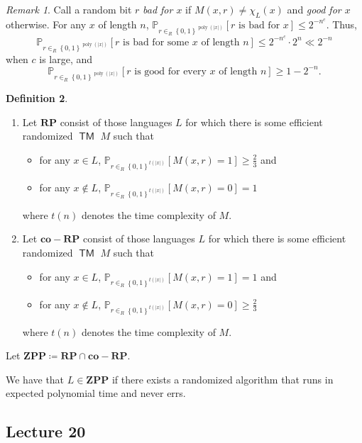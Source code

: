\documentclass[10pt,letterpaper,cm]{nupset}
\theoremstyle{definition}
\newtheorem{definition}{Definition}[subsection]
\theoremstyle{theorem}
\theoremstyle{remark}
\newtheorem{remark}[definition]{Remark}
\newcommand{\1}{\mathbf{1}}
\newcommand{\0}{\vec 0}
\DeclareMathOperator{\TM}{\mathsf{TM}}
\DeclareMathOperator{\poly}{poly}
\begin{document}
\begin{remark}\label{good}
Call a random bit $r$ \textit{bad for $x$} if $M(x, r) \ne \chi_L(x)$ and \textit{good for $x$} otherwise. For any $x$ of length $n$, $\mathbb{P}_{r\in_R \left\{0,1\right\}^{\poly(\lvert{x}\rvert)}}\left[r \text{ is bad for }x\right] \leq 2^{{-}n^c}$. Thus, $$\mathbb{P}_{r\in_R \left\{0,1\right\}^{\poly(\lvert{x}\rvert)}}\left[r \text{ is bad for some }x \text{ of length }n\right] \leq 2^{{-}n^c}\cdot 2^n \ll 2^{{-}n}$$ when $c$ is large, and $$\mathbb{P}_{r\in_R \left\{0,1\right\}^{\poly(\lvert{x}\rvert)}}\left[r \text{ is good for every }x \text{ of length }n\right] \geq 1 - 2^{{-}n}.$$
\end{remark}

\begin{definition} $ $
\begin{enumerate}
\item Let $\mathbf{RP}$ consist of those languages $L$ for which there is some efficient randomized $\TM$ $M$ such that 
\begin{itemize}
\item for any $x\in L$, $\mathbb{P}_{r\in_R \left\{0,1\right\}^{t(\lvert{x}\rvert)}}[M(x,r)=1] \geq \frac{2}{3}$ and
\item for any $x\notin L$, $\mathbb{P}_{r\in_R \left\{0,1\right\}^{t(\lvert{x}\rvert)}}[M(x,r)=0] = 1$
\end{itemize} where $t(n)$ denotes the time complexity of $M$.
\item Let $\mathbf{co{-}RP}$ consist of those languages $L$ for which there is some efficient randomized $\TM$ $M$ such that 
\begin{itemize}
\item for any $x\in L$, $\mathbb{P}_{r\in_R \left\{0,1\right\}^{t(\lvert{x}\rvert)}}[M(x,r)=1]= 1$ and
\item for any $x\notin L$, $\mathbb{P}_{r\in_R \left\{0,1\right\}^{t(\lvert{x}\rvert)}}[M(x,r)=0] \geq \frac{2}{3}$
\end{itemize} where $t(n)$ denotes the time complexity of $M$.
\end{enumerate}
Let $\mathbf{ZPP} \coloneqq \mathbf{RP} \cap \mathbf{co{-}RP}$.
\end{definition}

\smallskip


We have that $L \in \mathbf{ZPP}$ if there exists a randomized algorithm that runs in expected polynomial time and never errs. 


\subsection{Lecture 20}
\end{document}
